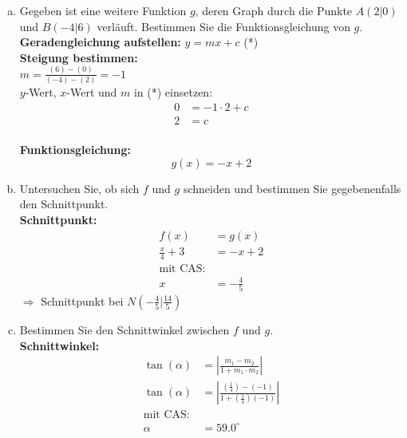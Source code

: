\documentclass[12pt,fleqn]{article}
\theoremstyle{aufg}
\theoremstyle{bsp}
\begin{document}
\begin{flushleft}
\begin{enumerate}[a)]
\item 
Gegeben ist eine weitere Funktion $g$, deren Graph durch die Punkte $A(2|0)$ und $B(-4|6)$ verl\"auft. Bestimmen Sie die Funktionsgleichung von $g$. \\ 
{\bf Geradengleichung aufstellen:} \quad $y=mx+c$ (*) \\ 
{\bf Steigung bestimmen:} \\ 
$m=\frac{(6)-(0)}{(-4)-(2)}=-1$ \\ 
$y$-Wert, $x$-Wert und $m$ in (*) einsetzen: 
\begin{align*} 
0&=-1\cdot2+ c \\ 
2&= c 
\end{align*} \\ 
{\bf Funktionsgleichung:} 
\[g(x)=- x + 2\]
\item 
Untersuchen Sie, ob sich $f$ und $g$ schneiden und bestimmen Sie gegebenenfalls den Schnittpunkt. \\ 
{\bf Schnittpunkt:} 
\begin{align*} 
f(x)&=g(x) \\ 
\frac{x}{4} + 3&=- x + 2 \\ 
\text{mit CAS:} \\ 
x&=- \frac{4}{5}\end{align*} 
$\Rightarrow$ Schnittpunkt bei $N(- \frac{4}{5}|\frac{14}{5})$ \\ 

\item 
Bestimmen Sie den Schnittwinkel zwischen $f$ und $g$. \\ 
{\bf Schnittwinkel:} \\ 
\begin{align*} 
\tan(\alpha) &=\left|\frac{m_1-m_2}{1+m_1\cdot m_2}\right| \\ 
\tan(\alpha) &=\left|\frac{(\frac{1}{4})-(-1)}{1+(\frac{1}{4})(-1)}\right| \\ 
\text{mit CAS:} \\ 
\alpha &=59.0^{\circ} 
\end{align*} 

\end{enumerate} 
\end{flushleft} 
\end{document}
